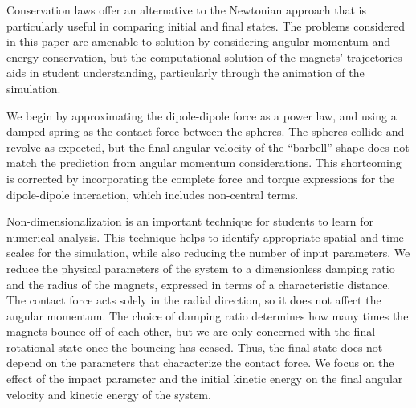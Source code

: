 \documentclass{article}
\begin{document}
Conservation laws offer an alternative to the Newtonian approach that is particularly useful in comparing initial and final states. The problems considered in this paper are amenable to solution by considering angular momentum and energy conservation, but the computational solution of the magnets' trajectories aids in student understanding, particularly through the animation of the simulation.

We begin by approximating the dipole-dipole force as a power law, and using a damped spring as the contact force between the spheres. The spheres collide and revolve as expected, but the final angular velocity of the ``barbell'' shape does not match the prediction from angular momentum considerations. 
This shortcoming is corrected by incorporating the complete force and torque expressions for the dipole-dipole interaction, which includes non-central terms.

Non-dimensionalization is an important technique for students to learn for numerical analysis. This technique helps to identify appropriate spatial and time scales for the simulation, while also reducing the number of input parameters. 
We reduce the physical parameters of the system to a dimensionless damping ratio and the radius of the magnets, expressed in terms of a characteristic distance. 
The contact force acts solely in the radial direction, so it does not affect the angular momentum. 
The choice of damping ratio determines how many times the magnets bounce off of each other, but we are only concerned with the final rotational state once the bouncing has ceased.
Thus, the final state does not depend on the parameters that characterize the contact force.
We  focus on the effect of the impact parameter and the initial kinetic energy on the final angular velocity and kinetic energy of the system.



\end{document}
